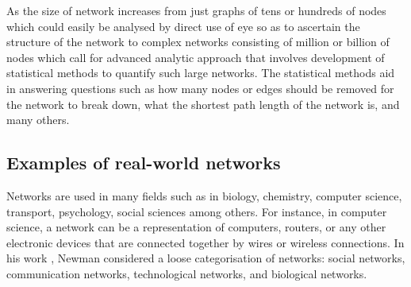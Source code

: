\documentclass[10pt,a4paper]{article}
\theoremstyle{plain}
\theoremstyle{definition}
\begin{document}
As the size of network increases from just graphs of tens or hundreds of nodes which could easily be analysed by direct use of eye so as to ascertain the structure of the network  to complex networks consisting of million or billion of nodes which call for advanced analytic approach that involves development of statistical methods to quantify such large networks. The statistical methods aid in answering questions such as how many nodes or edges should be removed for the network to break down, what  the shortest path length of the network is, and many others. 



\subsection{Examples of real-world networks}
Networks are used in many fields such as in biology, chemistry, computer science, transport, psychology, social sciences among others. For instance, in computer science, a network can be a representation of computers, routers, or any other electronic devices that are connected together by wires or wireless connections.
In his work \citep{newman2003structure}, Newman considered a loose categorisation of networks: social networks, communication networks, technological networks, and biological networks.
\end{document}
